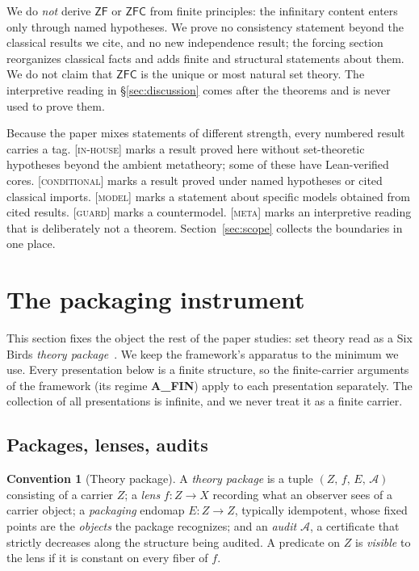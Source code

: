 \documentclass[11pt]{article}
\newcommand{\gradetag}[1]{\textnormal{\textsc{[#1]}}}
\newcommand{\inhouse}{\gradetag{in-house}}
\newcommand{\condg}{\gradetag{conditional}}
\newcommand{\modelg}{\gradetag{model}}
\newcommand{\guardg}{\gradetag{guard}}
\newcommand{\metag}{\gradetag{meta}}
\theoremstyle{definition}
\newtheorem{convention}[theorem]{Convention}
\begin{document}
We do \emph{not} derive $\mathsf{ZF}$ or $\mathsf{ZFC}$ from finite principles: the infinitary
content enters only through named hypotheses. We prove no consistency statement beyond the
classical results we cite, and no new independence result; the forcing section reorganizes
classical facts and adds finite and structural statements about them. We do not claim that
$\mathsf{ZFC}$ is the unique or most natural set theory. The interpretive reading in
\S\ref{sec:discussion} comes after the theorems and is never used to prove them.

Because the paper mixes statements of different strength, every numbered result carries a tag.
\inhouse{} marks a result proved here without set-theoretic hypotheses beyond the ambient
metatheory; some of these have Lean-verified cores. \condg{} marks a result proved under named
hypotheses or cited classical imports. \modelg{} marks a statement about specific models obtained
from cited results. \guardg{} marks a countermodel. \metag{} marks an interpretive reading that is
deliberately not a theorem. Section~\ref{sec:scope} collects the boundaries in one place.
 \section{The packaging instrument}\label{sec:instrument}

This section fixes the object the rest of the paper studies: set theory read as a Six Birds
\emph{theory package}~\citep{SBTFoundationsI}. We keep the framework's apparatus to the minimum
we use. Every presentation below is a finite structure, so the finite-carrier arguments of the
framework (its regime \textbf{A\_FIN}) apply to each presentation separately. The collection of
all presentations is infinite, and we never treat it as a finite carrier.

\subsection{Packages, lenses, audits}

\begin{convention}[Theory package]\label{conv:package}
A \emph{theory package} is a tuple $(Z,\,f,\,E,\,\mathcal A)$ consisting of a carrier $Z$; a
\emph{lens} $f\colon Z\to X$ recording what an observer sees of a carrier object; a
\emph{packaging} endomap $E\colon Z\to Z$, typically idempotent, whose fixed points are the
\emph{objects} the package recognizes; and an \emph{audit} $\mathcal A$, a certificate that
strictly decreases along the structure being audited. A predicate on $Z$ is \emph{visible} to
the lens if it is constant on every fiber of $f$.
\end{convention}
\end{document}

